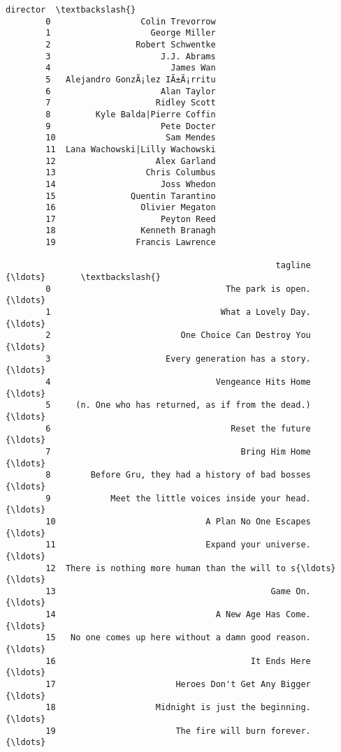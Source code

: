 \documentclass[11pt]{article}
\begin{document}
\begin{Verbatim}[commandchars=\\\{\}]
                                  director  \textbackslash{}
        0                  Colin Trevorrow   
        1                    George Miller   
        2                 Robert Schwentke   
        3                      J.J. Abrams   
        4                        James Wan   
        5   Alejandro GonzÃ¡lez IÃ±Ã¡rritu   
        6                      Alan Taylor   
        7                     Ridley Scott   
        8         Kyle Balda|Pierre Coffin   
        9                      Pete Docter   
        10                      Sam Mendes   
        11  Lana Wachowski|Lilly Wachowski   
        12                    Alex Garland   
        13                  Chris Columbus   
        14                     Joss Whedon   
        15               Quentin Tarantino   
        16                 Olivier Megaton   
        17                     Peyton Reed   
        18                 Kenneth Branagh   
        19                Francis Lawrence   
        
                                                      tagline      {\ldots}       \textbackslash{}
        0                                   The park is open.      {\ldots}        
        1                                  What a Lovely Day.      {\ldots}        
        2                          One Choice Can Destroy You      {\ldots}        
        3                       Every generation has a story.      {\ldots}        
        4                                 Vengeance Hits Home      {\ldots}        
        5     (n. One who has returned, as if from the dead.)      {\ldots}        
        6                                    Reset the future      {\ldots}        
        7                                      Bring Him Home      {\ldots}        
        8        Before Gru, they had a history of bad bosses      {\ldots}        
        9            Meet the little voices inside your head.      {\ldots}        
        10                              A Plan No One Escapes      {\ldots}        
        11                              Expand your universe.      {\ldots}        
        12  There is nothing more human than the will to s{\ldots}      {\ldots}        
        13                                           Game On.      {\ldots}        
        14                                A New Age Has Come.      {\ldots}        
        15   No one comes up here without a damn good reason.      {\ldots}        
        16                                       It Ends Here      {\ldots}        
        17                        Heroes Don't Get Any Bigger      {\ldots}        
        18                    Midnight is just the beginning.      {\ldots}        
        19                        The fire will burn forever.      {\ldots}        
        

\end{Verbatim}
\end{document}

